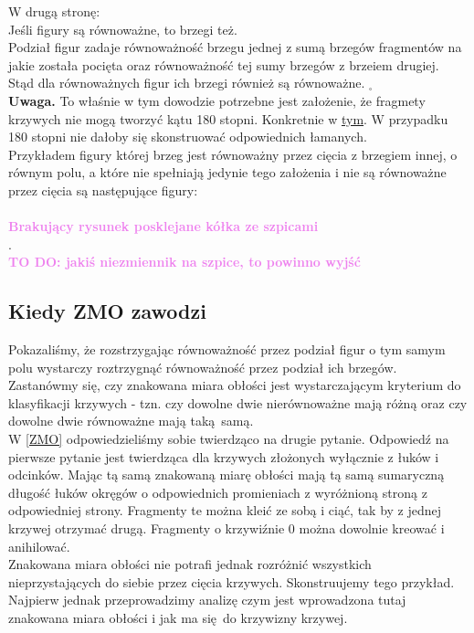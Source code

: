 \documentclass[a4paper, 12pt]{article}
\newcommand{\todo}[1]{\hfill \break \textbf{\Huge \textcolor{violet}{TO DO: #1} \hfill \break}\normalsize}
\newcommand{\rysunek}[1]{\hfill \break\\[16pt] \Huge \textbf{\textcolor{violet}{Brakujący rysunek \normalsize
#1}} \hfill
\break \\[16pt] \normalsize}
\begin{document}
W drugą stronę: \\
Jeśli figury są równoważne, to brzegi też. \\
Podział figur zadaje równoważność brzegu jednej z sumą brzegów fragmentów na jakie została pocięta
oraz równoważność tej sumy brzegów z brzeiem drugiej. Stąd dla równoważnych figur ich brzegi również są
równoważne.
$_\square$ \\
\textbf{Uwaga.} To właśnie w tym dowodzie potrzebne jest założenie, że fragmety krzywych nie mogą tworzyć
kątu 180 stopni. Konkretnie w \hyperref[180 stopni]{tym}. W przypadku 180 stopni nie dałoby się skonstruować
odpowiednich łamanych. \\
Przykładem figury której brzeg jest równoważny przez cięcia z brzegiem innej, o równym polu, a które nie
spełniają jedynie tego założenia i nie są równoważne przez cięcia są następujące figury: \\
\rysunek{posklejane kółka ze szpicami}.
 \\
\todo{jakiś niezmiennik na szpice, to powinno wyjść}

\subsection{Kiedy ZMO zawodzi}
Pokazaliśmy, że rozstrzygając równoważność przez podział figur o tym samym polu wystarczy roztrzygnąć
równoważność przez podział ich brzegów. Zastanówmy się, czy znakowana miara obłości jest wystarczającym
kryterium do klasyfikacji krzywych - tzn. czy dowolne dwie nierównoważne mają różną oraz czy dowolne
dwie równoważne mają taką samą. \\
W \ref{ZMO} odpowiedzieliśmy sobie twierdząco na drugie pytanie.
Odpowiedź na pierwsze pytanie jest twierdząca dla krzywych złożonych wyłącznie z łuków i odcinków.
Mając tą samą znakowaną miarę obłości mają tą samą sumaryczną długość łuków okręgów o odpowiednich
promieniach z wyróżnioną stroną z odpowiedniej strony. Fragmenty te można kleić ze sobą i ciąć, tak by
z jednej krzywej otrzymać drugą. Fragmenty o krzywiźnie 0 można dowolnie kreować i anihilować. \\
Znakowana miara obłości nie potrafi jednak rozróżnić wszystkich nieprzystających do siebie przez cięcia
krzywych. Skonstruujemy tego przykład. Najpierw jednak przeprowadzimy analizę czym jest
wprowadzona tutaj znakowana miara obłości i jak ma się do krzywizny krzywej.
\end{document}
